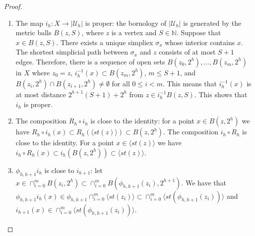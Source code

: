 \documentclass[a4paper,11pt]{article}
\theoremstyle{definition}
\theoremstyle{plain}
\theoremstyle{remark}
\begin{document}
{\begin{proof}
\begin{enumerate}
Let $x,y \in |\mathcal{U}_{h}|$ be points lying in a common simplex $\sigma=[z_0,\dots,z_{m}]$. $R_{h}(x), R_{h}(y)$ are contained in the union $\cup_{i=0}^{m}B(z_{i}, 2^h)$, which is a set of diameter $2^{h+2}$, since the intersection $\cap_{i=0}^{m}B(z_{i}, 2^h)$ is non-empty. This shows that $R_{h}$ is controlled.\\

Let $K\subset X$ be a bounded set. Since $X$ is proper, there exist $z_0,\dots, z_{m}\in Z_{h}$ such that $K\subset \cup_{i=0}^{m} B(z_i,2^h)$. We have that $R^{-1}_{h}(\cup_{i=0}^{m} B(z_i,2^h))\subset \cup_{i=0}^{m} |st(z_i)|$: for a point $x\notin \cup_{i=0}^{m} |st(z_i)|$, consider the unique simplex $\tau = [y_0,\dots,y_n]$ such that $x\in int(\tau)$. We have that $R_{h}(x)\subset \cap_{j=0}^{n} B(y_i,2^h)$. If there is an $i$ such that $R_{h}(x)\in B(z_i,2^h)$, then $[y_0,\dots,y_n,z_i]$ is a simplex in $|\mathcal{U}_{h}|$, contradiction. The set $\cup_{i=0}^{m} |st(z_i)|$ has diameter $\leq \max_{i,j=0,\dots,m}\{d(z_i,z_j)\} +2$. This shows that $R_{h}$ is proper. 

\item  The map $i_{h}: X \rightarrow |\mathcal{U}_{h}|$ is proper: the bornology of $|\mathcal{U}_{h}|$ is generated by the metric balls $B(z,S)$, where $z$ is a vertex and $S\in \mathbb{N}$. Suppose that $x \in B(z,S)$. There exists a unique simpliex $\sigma_{x}$ whose interior contains $x$. The shortest simplicial path between $\sigma_{x}$ and $z$ consists of at most $S+1$ edges. Therefore, there is a sequence of open sets $B(z_{0},2^h),\dots, B(z_{m},2^h)$ in $X$ where $z_0 = z$,  $i_{h}^{-1}(x) \subset B(z_{m},2^h)$, $m\leq S+1$, and $B(z_{i},2^h)\cap B(z_{i+1},2^h)\neq \emptyset$ for all $0\leq i< m$. This means that $i_{h}^{-1}(x)$ is at most distance $2^{h+1}(S+1)+ 2^{h}$ from $z\in  i_{h}^{-1}B(z,S)$. This shows that $i_{h}$ is proper. \\





\item The composition $R_{h} \circ i_{h}$ is close to the identity: for a point $x \in B(z,2^h)$ we have $R_{h} \circ i_{h} (x)\subset R_{h} (\langle st(z)\rangle) \subset B(z,2^h)$. The composition $i_{h} \circ R_{h}$ is close to the identity. For a point $x \in \langle st(z) \rangle $ we have $i_{h} \circ R_{h}(x) \subset i_{h}(B(z,2^h)) \subset \langle st(z)\rangle$. 
\item $\phi_{h,h+1} i_{h}$ is close to $i_{h+1}$: let $x\in \cap_{i=0}^m B(z_i,2^h)\subset \cap_{i=0}^m B(\phi_{h,h+1}(z_i),2^{h+1})$. We have that $\phi_{h,h+1} i_{h}(x)\in \phi_{h,h+1} \cap_{i=0}^m \langle st(z_i) \rangle \subset  \cap_{i=0}^m \langle st(\phi_{h,h+1}(z_i)) \rangle$ and $ i_{h+1}(x)\in  \cap_{i=0}^m \langle st(\phi_{h,h+1}(z_i)) \rangle$. \\


\end{enumerate}
\end{proof}}
\end{document}
